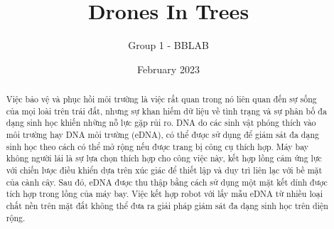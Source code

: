 \documentclass[12pt,a4paper]{article}
\title{Drones In Trees}
\author{Group 1 - BBLAB}
\date{February 2023}
\begin{document}
\maketitle
\begin{abstract}
    Việc bảo vệ và phục hồi môi trường là việc rất quan trong nó liên quan đến sự sống của mọi loài trên trái đất, nhưng sự khan hiếm dữ liệu về tình trạng và sự phân bố đa dạng sinh học khiến những nỗ lực gặp rủi ro. DNA do các sinh vật phóng thích vào môi trường hay DNA môi trường (eDNA), có thể được sử dụng để giám sát đa dạng sinh học theo cách có thể mở rộng nếu được trang bị công cụ thích hợp. Máy bay không người lái là sự lựa chọn thích hợp cho công việc này, kết hợp lồng cảm ứng lực với chiến lược điều khiển dựa trên xúc giác để thiết lập và duy trì liên lạc với bề mặt của cành cây. Sau đó, eDNA được thu thập bằng cách sử dụng một mặt kết dính được tích hợp trong lồng của máy bay. Việc kết hợp robot với lấy mẫu eDNA từ nhiều loại chất nền trên mặt đất không thể đưa ra giải pháp giám sát đa dạng sinh học trên diện rộng.
\end{abstract}
\tableofcontents
\newpage
\end{document}
